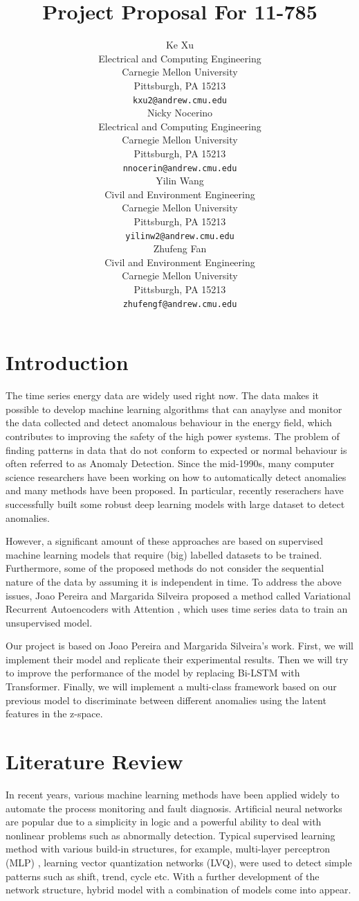 \documentclass{article}
\title{Project Proposal For 11-785}
\author{%
  Ke Xu \\
  Electrical and Computing Engineering\\
  Carnegie Mellon University\\
  Pittsburgh, PA 15213 \\
  \texttt{kxu2@andrew.cmu.edu} \\

  \And
  Nicky Nocerino \\
  Electrical and Computing Engineering\\
  Carnegie Mellon University\\
  Pittsburgh, PA 15213 \\
  \texttt{nnocerin@andrew.cmu.edu} \\

  \And
  Yilin Wang \\
  Civil and Environment Engineering\\
  Carnegie Mellon University\\
  Pittsburgh, PA 15213 \\
  \texttt{yilinw2@andrew.cmu.edu} \\


  \And
  Zhufeng Fan \\
  Civil and Environment Engineering\\
  Carnegie Mellon University\\
  Pittsburgh, PA 15213 \\
  \texttt{zhufengf@andrew.cmu.edu} \\
}
\begin{document}
\maketitle

\section{Introduction}
The time series energy data are widely used right now. The data makes it possible to develop machine learning algorithms that can anaylyse and monitor the data collected and detect anomalous behaviour in the energy field, which contributes to improving the safety of the high power systems. The problem of finding patterns in data that do not conform to expected or normal behaviour is often referred to as Anomaly Detection. Since the mid-1990s, many computer science researchers have been working on how to automatically detect anomalies and many methods have been proposed. In particular, recently reserachers have successfully built some robust deep learning models with large dataset to detect anomalies. 

However, a significant amount of these approaches are based on supervised machine learning models that require (big) labelled datasets to be trained. Furthermore, some of the proposed methods do not consider the sequential nature of the data by assuming it is independent in time. To address the above issues, Joao Pereira and Margarida Silveira proposed a method called Variational Recurrent Autoencoders with Attention \cite{AuthorJM}, which uses time series data to train an unsupervised model. 

Our project is based on Joao Pereira and Margarida Silveira's work. First, we will implement their model and replicate their experimental results. Then we will try to improve the performance of the model by replacing Bi-LSTM with Transformer. Finally, we will implement a multi-class framework based on our previous model to discriminate between different anomalies using the latent features in the z-space.

\section{Literature Review}
In recent years, various machine learning methods have been applied widely to automate the process monitoring and fault diagnosis. Artificial neural networks are popular due to a simplicity in logic and a powerful ability to deal with nonlinear problems such as abnormally detection. Typical supervised learning method with various build-in structures, for example, multi-layer perceptron (MLP) \cite{AuthorSI}, learning vector quantization networks (LVQ), were used to detect simple patterns such as shift, trend, cycle etc. With a further development of the network structure, hybrid model with a combination of models come into appear.
\end{document}

